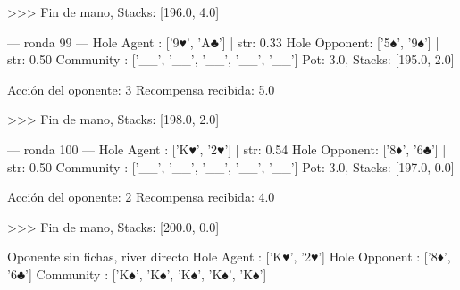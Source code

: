 >>> Fin de mano, Stacks: [196.0, 4.0]


--- ronda 99 ---
Hole Agent : ['9♥', 'A♣'] | str: 0.33
Hole Opponent: ['5♠', '9♠'] | str: 0.50
Community  : ['__', '__', '__', '__', '__']
Pot: 3.0, Stacks: [195.0, 2.0]

Acción del oponente: 3
Recompensa recibida: 5.0

>>> Fin de mano, Stacks: [198.0, 2.0]


--- ronda 100 ---
Hole Agent : ['K♥', '2♥'] | str: 0.54
Hole Opponent: ['8♦', '6♣'] | str: 0.50
Community  : ['__', '__', '__', '__', '__']
Pot: 3.0, Stacks: [197.0, 0.0]

Acción del oponente: 2
Recompensa recibida: 4.0

>>> Fin de mano, Stacks: [200.0, 0.0]


Oponente sin fichas, river directo
Hole Agent    : ['K♥', '2♥']
Hole Opponent : ['8♦', '6♣']
Community     : ['K♠', 'K♠', 'K♠', 'K♠', 'K♠']
